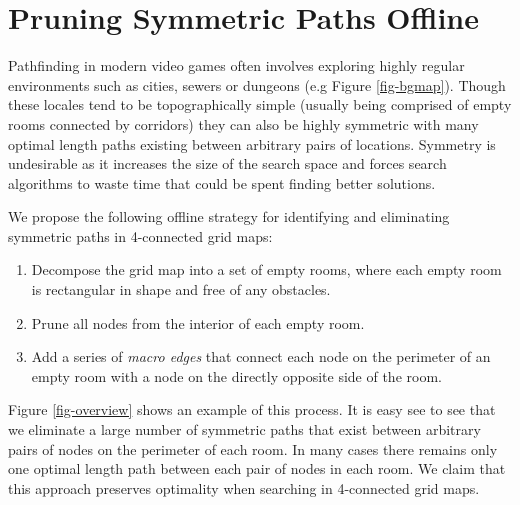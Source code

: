 \section{Pruning Symmetric Paths Offline}
\label{algorithm}
Pathfinding in modern video games often involves exploring highly regular 
environments such as cities, sewers or dungeons (e.g Figure \ref{fig-bgmap}).
Though these locales tend to be topographically simple (usually being comprised
of empty rooms connected by corridors) they can also be highly symmetric 
with many optimal length paths existing between arbitrary pairs of locations.
Symmetry is undesirable as it increases the size of the search space
and forces search algorithms to waste time that could be spent finding better solutions.
\par
We propose the following offline strategy for identifying and eliminating symmetric paths in 
4-connected grid maps:
\begin{enumerate}
\item{Decompose the grid map into a set of empty rooms, where each empty room is 
rectangular in shape and free of any obstacles.}
\item{Prune all nodes from the interior of each empty room.}
\item{Add a series of \emph{macro edges} that connect each node on the perimeter of an empty room
with a node on the directly opposite side of the room.}
\end{enumerate}
Figure \ref{fig-overview} shows an example of this process.
It is easy see to see that we eliminate a large number of symmetric paths
that exist between arbitrary pairs of nodes on the perimeter of each room.
In many cases there remains only one optimal length path between each 
pair of nodes in each room.
We claim that this approach preserves optimality when searching in 
4-connected grid maps. 

